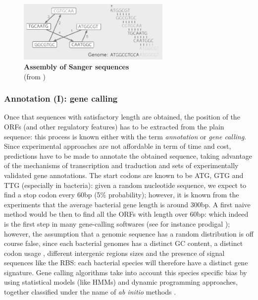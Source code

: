 \begin{figure}[!tb]
	\center
    \includegraphics[width=0.66\textwidth]{figures/Introduction/thesis_2}
	\caption{\label{fig:assembly}\textbf{Assembly of Sanger sequences}\\
			(from \cite{compeau2011apply})}
\end{figure}

\subsubsection*{Annotation (I): gene calling}
Once that sequences with satisfactory length are obtained, the position of the ORFs (and other regulatory features) has to be extracted from the plain sequence: this process is known either with the term \textit{annotation} or \textit{gene calling}. Since experimental approaches are not affordable in term of time and cost, predictions have to be made to annotate the obtained sequence, taking advantage of the mechanisms of transcription and traduction and sets of experimentally validated gene annotations. The start codons are known to be ATG, GTG and TTG (especially in bacteria): given a random nucleotide sequence, we expect to find a stop codon every 60bp (5\% probability); however, it is known from the experiments that the average bacterial gene length is around 300bp. A first naive method would be then to find all the ORFs with length over 60bp: which indeed is the first step in many gene-calling softwares (see for instance prodigal \cite{hyatt2010prodigal}); however, the assumption that a genomic sequence has a random distribution is off course false, since each bacterial genomes has a distinct GC content, a distinct codon usage \cite{ermolaeva2001synonymous}, different intergenic regions sizes and the presence of signal sequences like the RBS: each bacterial species will therefore have a distinct gene signature. Gene calling algorithms take into account this species specific bias by using statistical models (like HMMs) and dynamic programming approaches, together classified under the name of \textit{ab initio} methods \cite{do2006computational}. 


